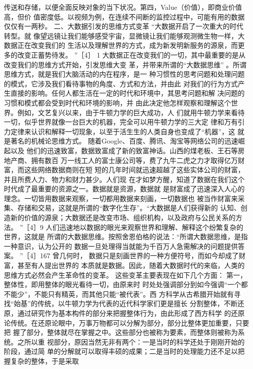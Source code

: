 \documentclass[11pt]{ctexart}
\begin{document}
{{{{传送和存储，以便全面反映对象的当下状况。第四，Value（价值），即商业价值高，但价
值密度低。以视频为例，在连续不间断的监控过程中，可能有用的数据
仅仅有一两秒。 二、大数据引发的思维方式变革 “大数据开启了一次重大的时代转型。就
像望远镜让我们能够感受宇宙，显微镜让我们能够观测微生物一样，大数据正在改变我们的
生活以及理解世界的方式，成为新发明新服务的源泉，而更多的改变正蓄势待发。 ”［4］
1 大数据正在改变我们的一切，其中最重要的是从改变我们的思维方式开始，引发思维大变
革，并带来所谓的“大数据思维” 。所谓思维方式，就是我们大脑活动的内在程序，是一
种习惯性的思考问题和处理问题的模式，它涉及我们看待事物的角度、方式和方法，并由此
对我们的行为方式产生直接的影响。任何人都生活在一定的时代和环境中，其思考问题和解
决问题的习惯和模式都会受到时代和环境的影响，并
由此决定他怎样观察和理解这个世界。例如，文艺复兴以来，由于牛顿力学的巨大成功，人
们就用牛顿力学来看待一切，似乎世界就像一台巨大的机器，完全可以用牛顿力学的三大定
律和万有引力定律来认识和解释一切现象，以至于活生生的人类自身也变成了“机器”，这
就是著名的机械论思维方式。 随着Google、百度、腾讯、淘宝等网络公司的迅速崛起以及
他们的迅速致富，数据致富成了新的致富神话。山西的煤老板、王石等房地产商、拥有数百
万一线工人的富士康公司等，费了九牛二虎之力才取得亿万财富，而这些网络数据商则在短
短的几年时间就迅速超越了这些实体公司的财富，并且所费人力、物力和财力甚少。人们现
在才如梦方醒，知道了数据在我们这个时代成了最重要的资源之一。数据就是资源，数据就
是财富成了迅速深入人心的理念。一切皆用数据来观察，一切都用数据来刻画，一切数据也
被当作财富来采集、存储和交易，这就是所谓的“数字化生存”。“大数据是人们获得新的
认知、创造新的价值的源泉；大数据还是改变市场、组织机构，以及政府与公民关系的方法。
”［4］9 人们迅速地以数据的眼光来观察世界和理解、解释这个纷繁复杂的世界，这就是
所谓的大数据思维。按照舍恩伯格的说法：“所谓大数据思维，是指一种意识，认为公开的
数据一旦处理得当就能为千百万人急需解决的问题提供答案。 ”［4］167
曾几何时， 数据只是刻画世界的一种方便符号，而如今却成了财富，甚至有人提出世界的
本质就是数据。因此，随着大数据时代的来临，人类的思维方式必然会产生革命性的变革。
这些变革主要表现在如下几个方面： 第一，整体性，即用整体的眼光看待一切，由原来时
时处处强调部分到如今强调“一个都不能少”，不能只有精英，而其他只能“被代表”。西
方科学从古希腊开始就有寻找“始基”的传统，以牛顿力学为代表的近代科学家们更是擅长
分割整体，不断还原，通过研究作为基本构件的部分来把握整体行为，由此形成了西方科学
的还原论传统。在还原论眼中，万事万物都可以分解为部分，部分比整体更加重要，只要把
握了部分，整体就尽在掌握之中。这些部分也被称为要素，而整体则被称为系统。之所以重
视部分，原因当然无非有两个：一是当时的科学还处于刚刚开始的阶段，通过简
单的分解就可以取得丰硕的成果；二是当时的处理能力还不足以把握复杂的整体，于是采取
}}}}
\end{document}
